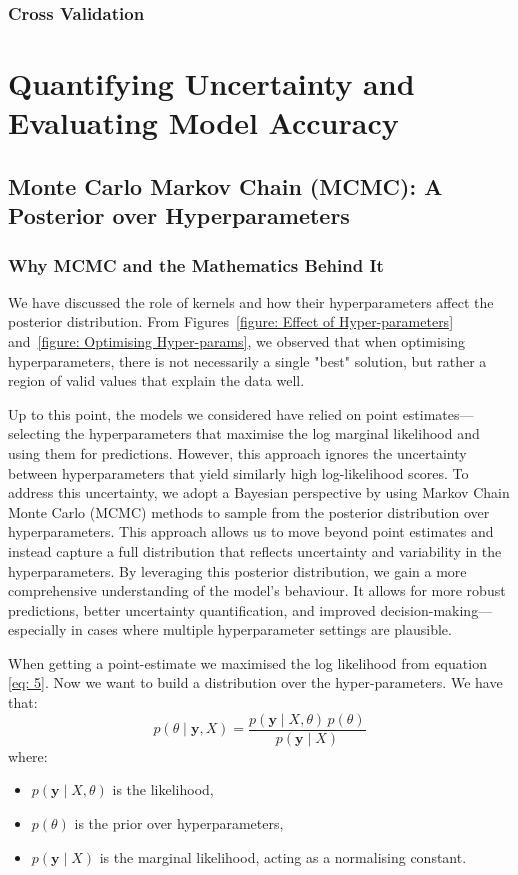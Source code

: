 \documentclass{article}
\begin{document}
\subsubsection{Cross Validation}


\section{Quantifying Uncertainty and Evaluating Model Accuracy}
\label{sec:uncertainty_and_evaluation}
\subsection{Monte Carlo Markov Chain (MCMC): A Posterior over Hyperparameters}
\label{sec: MCMC}

\subsubsection*{Why MCMC and the Mathematics Behind It}

We have discussed the role of kernels and how their hyperparameters affect the posterior distribution. From Figures~\ref{figure: Effect of Hyper-parameters} and~\ref{figure: Optimising Hyper-params}, we observed that when optimising hyperparameters, there is not necessarily a single "best" solution, but rather a region of valid values that explain the data well.

\noindent
Up to this point, the models we considered have relied on point estimates—selecting the hyperparameters that maximise the log marginal likelihood and using them for predictions. However, this approach ignores the uncertainty between hyperparameters that yield similarly high log-likelihood scores.
To address this uncertainty, we adopt a Bayesian perspective by using Markov Chain Monte Carlo (MCMC) methods to sample from the posterior distribution over hyperparameters. This approach allows us to move beyond point estimates and instead capture a full distribution that reflects uncertainty and variability in the hyperparameters.
By leveraging this posterior distribution, we gain a more comprehensive understanding of the model's behaviour. It allows for more robust predictions, better uncertainty quantification, and improved decision-making—especially in cases where multiple hyperparameter settings are plausible.

\bigskip
\noindent
When getting a point-estimate we maximised the log likelihood from equation \ref{eq: 5}. Now we want to build a distribution over the hyper-parameters. We have that:
\[
p(\theta \mid \mathbf{y}, X) = \frac{p(\mathbf{y} \mid X, \theta) \, p(\theta)}{p(\mathbf{y} \mid X)}
\]
where:
\begin{itemize}
    \item \( p(\mathbf{y} \mid X, \theta) \) is the likelihood,
    \item \( p(\theta) \) is the prior over hyperparameters,
    \item \( p(\mathbf{y} \mid X) \) is the marginal likelihood, acting as a normalising constant.
\end{itemize}
\end{document}
